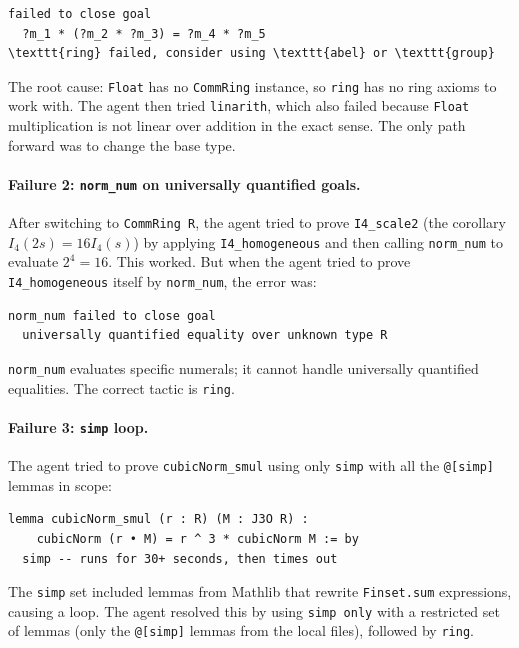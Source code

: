 \documentclass[11pt]{article}
\theoremstyle{definition}
\newcommand{\Iq}{I_4}
\begin{document}
\begin{lstlisting}
failed to close goal
  ?m_1 * (?m_2 * ?m_3) = ?m_4 * ?m_5
\texttt{ring} failed, consider using \texttt{abel} or \texttt{group}
\end{lstlisting}

The root cause: \texttt{Float} has no \texttt{CommRing} instance, so
\texttt{ring} has no ring axioms to work with. The agent then tried
\texttt{linarith}, which also failed because \texttt{Float} multiplication
is not linear over addition in the exact sense. The only path forward was
to change the base type.

\paragraph{Failure 2: \texttt{norm\_num} on universally quantified goals.}
After switching to \texttt{CommRing R}, the agent tried to prove
\texttt{I4\_scale2} (the corollary $\Iq(2s)=16\Iq(s)$) by applying
\texttt{I4\_homogeneous} and then calling \texttt{norm\_num} to evaluate
$2^4=16$. This worked. But when the agent tried to prove
\texttt{I4\_homogeneous} itself by \texttt{norm\_num}, the error was:

\begin{lstlisting}
norm_num failed to close goal
  universally quantified equality over unknown type R
\end{lstlisting}

\texttt{norm\_num} evaluates specific numerals; it cannot handle
universally quantified equalities. The correct tactic is \texttt{ring}.

\paragraph{Failure 3: \texttt{simp} loop.}
The agent tried to prove \texttt{cubicNorm\_smul} using only
\texttt{simp} with all the \texttt{@[simp]} lemmas in scope:

\begin{lstlisting}
lemma cubicNorm_smul (r : R) (M : J3O R) :
    cubicNorm (r • M) = r ^ 3 * cubicNorm M := by
  simp -- runs for 30+ seconds, then times out
\end{lstlisting}

The \texttt{simp} set included lemmas from Mathlib that rewrite
\texttt{Finset.sum} expressions, causing a loop. The agent resolved this
by using \texttt{simp only} with a restricted set of lemmas (only the
\texttt{@[simp]} lemmas from the local files), followed by \texttt{ring}.
\end{document}
